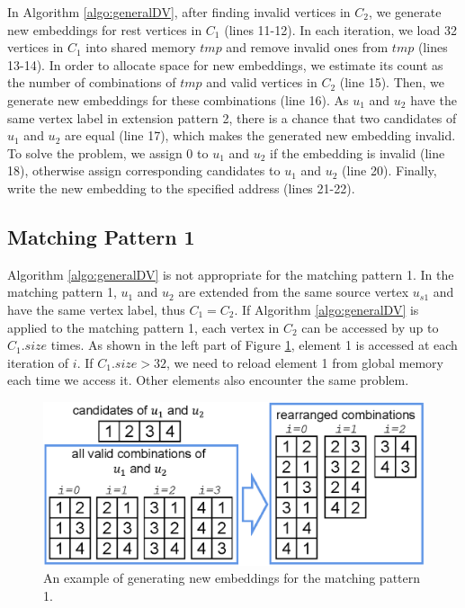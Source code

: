In Algorithm \ref{algo:generalDV}, after finding invalid vertices in $C_2$, we generate new embeddings for rest vertices in $C_1$ (lines 11-12). In each iteration, we load 32 vertices in $C_1$ into shared memory $tmp$ and remove invalid ones from $tmp$ (lines 13-14). In order to allocate space for new embeddings, we estimate its count as the number of combinations of $tmp$ and valid vertices in $C_2$ (line 15). Then, we generate new embeddings for these combinations (line 16). As $u_1$ and $u_2$ have the same vertex label in extension pattern 2, there is a chance that two candidates of $u_1$ and $u_2$ are equal (line 17), which makes the generated new embedding invalid. To solve the problem, we assign 0 to $u_1$ and $u_2$ if the embedding is invalid (line 18), otherwise assign corresponding candidates to $u_1$ and $u_2$ (line 20). Finally, write the new embedding to the specified address (lines 21-22).

\subsection{Matching Pattern 1}
Algorithm \ref{algo:generalDV} is not appropriate for the matching pattern 1. In the matching pattern 1, $u_1$ and $u_2$ are extended from the same source vertex $u_{s1}$ and have the same vertex label, thus $C_1 = C_2$. If Algorithm \ref{algo:generalDV} is applied to the matching pattern 1, each vertex in $C_2$ can be accessed by up to $C_1.size$ times. As shown in the left part of Figure \ref{fig:ep1opt}, element 1 is accessed at each iteration of $i$. If $C_1.size>32$, we need to reload element 1 from global memory each time we access it. Other elements also encounter the same problem.

\begin{figure}
\centering
\includegraphics[width=\columnwidth]{./figure/ep1opt.eps}
\caption{An example of generating new embeddings for the matching pattern 1.}	
\label{fig:ep1opt}
\end{figure}

